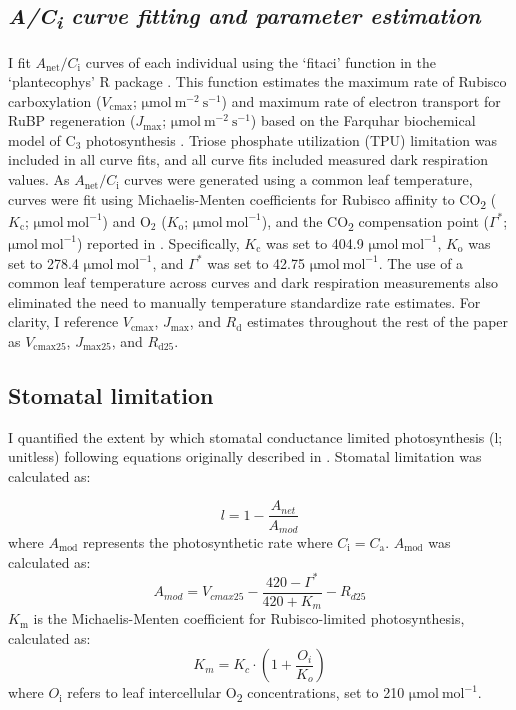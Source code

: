 \subsection{\textit{A/C\textsubscript{i} curve fitting and parameter estimation}}
I fit $A_\mathrm{{net}}/C_\mathrm{i}$ curves of each individual using the ‘fitaci’ function in the ‘plantecophys’ R package . This function estimates the maximum rate of Rubisco carboxylation ($V_{\mathrm{cmax}}$; $\mathrm{\mu mol\ m^{-2}\ s^{-1}}$) and maximum rate of electron transport for RuBP regeneration ($J_{\mathrm{max}}$; $\mathrm{\mu mol\ m^{-2}\ s^{-1}}$) based on the Farquhar biochemical model of C$_{3}$ photosynthesis . Triose phosphate utilization (TPU) limitation was included in all curve fits, and all curve fits included measured dark respiration values. As $A_\mathrm{{net}}/C_\mathrm{i}$ curves were generated using a common leaf temperature, curves were fit using Michaelis-Menten coefficients for Rubisco affinity to CO\textsubscript{2} ($K_\mathrm{c}$; $\mathrm{\mu mol\ mol^{-1}}$) and $\mathrm{O_2}$ ($K_\mathrm{o}$; $\mathrm{\mu mol\ mol^{-1}}$), and the CO\textsubscript{2} compensation point ($\Gamma^*$; $\mathrm{\mu mol\ mol^{-1}}$) reported in . Specifically, $K_\mathrm{c}$ was set to 404.9 $\mathrm{\mu mol\ mol^{-1}}$, $K_\mathrm{o}$ was set to 278.4 $\mathrm{\mu mol\ mol^{-1}}$, and $\Gamma^*$ was set to 42.75 $\mathrm{\mu mol\ mol^{-1}}$. The use of a common leaf temperature across curves and dark respiration measurements also eliminated the need to manually temperature standardize rate estimates. For clarity, I reference $V_{\mathrm{cmax}}$, $J_{\mathrm{max}}$, and $R_{\mathrm{d}}$ estimates throughout the rest of the paper as $V_{\mathrm{cmax25}}$, $J_{\mathrm{max25}}$, and $R_{\mathrm{d25}}$.

\subsection{Stomatal limitation}
I quantified the extent by which stomatal conductance limited photosynthesis (l; unitless) following equations originally described in . Stomatal limitation was calculated as:

\begin{equation} \label{eq_5.3}
    l = 1 - \frac{A_{net}}{A_{mod}}
\end{equation}
\noindent where $A_\mathrm{mod}$ represents the photosynthetic rate where $C_\mathrm{{i}}=C_\mathrm{{a}}$. $A_\mathrm{mod}$ was calculated as:
\begin{equation} \label{eq_5.4}
    A_{mod} = V_{cmax25} - \frac{420 - \Gamma^*}{420 + K_{m}} - R_{d25}
\end{equation}
\noindent $K_\mathrm{m}$ is the Michaelis-Menten coefficient for Rubisco-limited photosynthesis, calculated as:
\begin{equation} \label{eq_5.5}
    K_{m} = K_{c} \cdot \left ( 1 + \frac{O_i}{K_o} \right )
\end{equation}
\noindent where $O_\mathrm{i}$ refers to leaf intercellular O\textsubscript{2} concentrations, set to 210 $\mathrm{\mu mol\ mol^{-1}}$.

